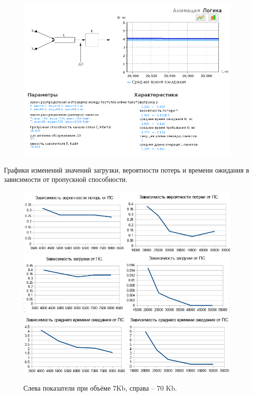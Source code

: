\documentclass[12pt, a4paper] {ncc}
\begin{document}
		\begin{figure}[h!]
			\includegraphics[scale=0.5]{./img/fifo_25000_70000.png}
		\end{figure}
		\newpage
		Графики изменений значений загрузки, вероятности потерь и времени ожидания в зависимости от
        пропускной способности.
		\begin{figure}[h!]
			\includegraphics[scale=0.5]{./img/fifo_cmp1.png}
			\includegraphics[scale=0.5]{./img/fifo_cmp2.png}
			\caption{Слева показатели при объёме 7Kb, справа -- 70 Kb.}
		\end{figure}
		
\end{document}
